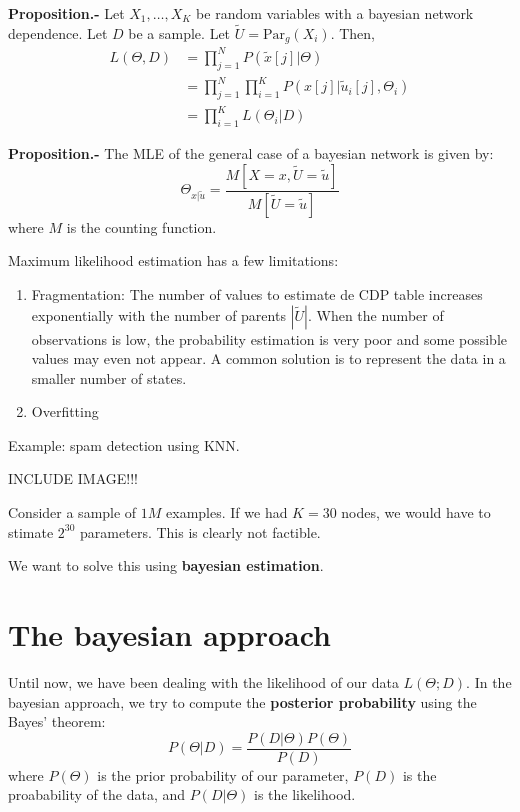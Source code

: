 \documentclass[
]{article}
\begin{document}
\textbf{Proposition.-} Let \(X_1, \dots, X_K\) be random variables with
a bayesian network dependence. Let \(D\) be a sample. Let
\(\tilde U = \text{Par}_g(X_i)\). Then, \begin{align*}
L(\Theta,D) & = \prod_{j=1}^N P(\tilde x[j]|\Theta)\\
& = \prod_{j=1}^N \prod_{i=1}^{K} P(x[j]| \tilde u_i[j],\Theta_i)\\
& = \prod_{i=1}^{K} L(\Theta_i| D)
\end{align*}

\textbf{Proposition.-} The MLE of the general case of a bayesian network
is given by: \[
\Theta_{x|\tilde u} = \frac{M[X = x, \tilde U = \tilde u]}{M[\tilde U = \tilde u]}
\] where \(M\) is the counting function.


Maximum likelihood estimation has a few limitations:

\begin{enumerate}
  \item Fragmentation: The number of values to estimate de CDP table increases exponentially with the number of parents \(|\tilde U|\). When the number of observations is low, the probability estimation is very poor and some possible values may even not appear. A common solution is to represent the data in a smaller number of states.
        \item Overfitting
\end{enumerate}


Example: spam detection using KNN.

INCLUDE IMAGE!!!

Consider a sample of \(1M\) examples. If we had \(K = 30\) nodes, we would have to stimate \(2^{30}\) parameters. This is clearly not factible.



We want to solve this using \textbf{bayesian estimation}.

\section{The bayesian approach}

Until now, we have been dealing with the likelihood of our data \(L(\Theta ;D)\). In the bayesian approach, we try to compute the \textbf{posterior probability} using the Bayes' theorem:
\[
  P(\Theta|D) = \frac{P(D|\Theta)P(\Theta)}{P(D)}
\]
where \(P(\Theta)\) is the prior probability of our parameter, \(P(D)\) is the proabability of the data, and \(P(D|\Theta)\) is the likelihood.\\
\end{document}
